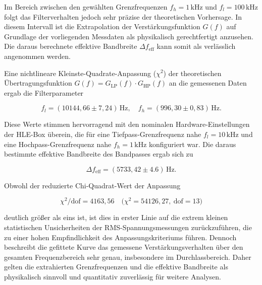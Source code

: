 Im Bereich zwischen den gewählten Grenzfrequenzen $f_h = 1\,\mathrm{kHz}$ und $f_l = 100\,\mathrm{kHz}$ folgt das Filterverhalten jedoch sehr präzise der theoretischen Vorhersage. 
In diesem Intervall ist die Extrapolation der Verstärkungsfunktion $G(f)$ auf Grundlage der vorliegenden Messdaten als physikalisch gerechtfertigt anzusehen. 
Die daraus berechnete effektive Bandbreite $\Delta f_{\mathrm{eff}}$ kann somit als verlässlich angenommen werden.

Eine nichtlineare Kleinste-Quadrate-Anpassung ($\chi^2$) der theoretischen Übertragungsfunktion $G(f)=G_{\mathrm{LP}}(f)\cdot G_{\mathrm{HP}}(f)$ an die gemessenen Daten ergab die Filterparameter

\begin{equation}
  f_l = (10144{,}66 \pm 7{,}24)\,\mathrm{Hz}, 
  \quad
  f_h = (996{,}30 \pm 0{,}83)\,\mathrm{Hz}.
\end{equation}

Diese Werte stimmen hervorragend mit den nominalen Hardware-Einstellungen der HLE-Box überein, die für eine Tiefpass-Grenzfrequenz nahe $f_l = 10\,\mathrm{kHz}$ und eine Hochpass-Grenzfrequenz nahe $f_h = 1\,\mathrm{kHz}$ konfiguriert war. 
Die daraus bestimmte effektive Bandbreite des Bandpasses ergab sich zu

\begin{equation}
  \Delta f_{\mathrm{eff}} = (5733{,}42 \pm 4.6)\,\mathrm{Hz}.
\end{equation}

Obwohl der reduzierte Chi-Quadrat-Wert der Anpassung

\begin{equation}
  \chi^2/\mathrm{dof} = 4163{,}56
  \quad
  \bigl(\chi^2 = 54126{,}27,\ \mathrm{dof} = 13\bigr)
\end{equation}

deutlich größer als eins ist, ist dies in erster Linie auf die extrem kleinen statistischen Unsicherheiten der RMS-Spannungsmessungen zurückzuführen, die zu einer hohen Empfindlichkeit des Anpassungskriteriums führen. 
Dennoch beschreibt die gefittete Kurve das gemessene Verstärkungsverhalten über den gesamten Frequenzbereich sehr genau, insbesondere im Durchlassbereich. 
Daher gelten die extrahierten Grenzfrequenzen und die effektive Bandbreite als physikalisch sinnvoll und quantitativ zuverlässig für weitere Analysen.
